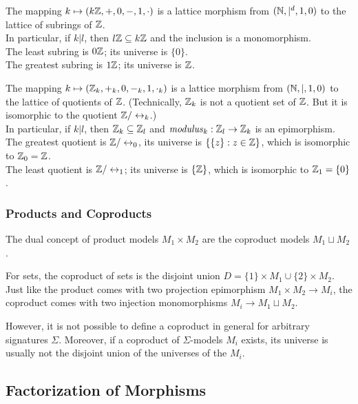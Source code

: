 \begin{example}\quad
\begin{compactitem}
\item The mapping $k\mapsto (k\mathbb{Z},+,0,-,1,\cdot)$ is a lattice morphism from $(\mathbb{N},|^d,1,0)$ to the lattice of subrings of $\mathbb{Z}$.\\
In particular, if $k|l$, then $l\mathbb{Z}\subseteq k\mathbb{Z}$ and the inclusion is a monomorphism.\\
The least subring is $0\mathbb{Z}$; its universe is $\{0\}$.\\
The greatest subring is $1\mathbb{Z}$; its universe is $\mathbb{Z}$.
\item The mapping $k\mapsto (\mathbb{Z}_k,+_k,0,-_k,1,\cdot_k)$ is a lattice morphism from $(\mathbb{N},|,1,0)$ to the lattice of quotients of $\mathbb{Z}$.
(Technically, $\mathbb{Z}_k$ is not a quotient set of $\mathbb{Z}$. But it is isomorphic to the quotient $\Z/\Equiv_k$.)\\
In particular, if $k|l$, then $\mathbb{Z}_k\subseteq \mathbb{Z}_l$ and $\mathit{modulus}_k:\mathbb{Z}_l\to\mathbb{Z}_k$ is an epimorphism.\\
The greatest quotient is $\Z/\Equiv_0$, its universe is $\{\{z\}:z\in \mathbb{Z}\}$, which is isomorphic to $\mathbb{Z}_0=\mathbb{Z}$.\\
The least quotient is $\Z/\Equiv_1$; its universe is $\{\mathbb{Z}\}$, which is isomorphic to $\mathbb{Z}_1=\{0\}$.
\end{compactitem}
\end{example}

\subsubsection{Products and Coproducts}\label{sec:univ:meta:prodcoprod}

The dual concept of product models $M_1\times M_2$ are the coproduct models $M_1\sqcup M_2$.

For sets, the coproduct of sets is the disjoint union $D=\{1\}\times M_1\cup \{2\}\times M_2$.
Just like the product comes with two projection epimorphism $M_1\times M_2\to M_i$, the coproduct comes with two injection monomorphisms $M_i\to M_1\sqcup M_2$.

However, it is not possible to define a coproduct in general for arbitrary signatures $\Sigma$.
Moreover, if a coproduct of $\Sigma$-models $M_i$ exists, its universe is usually not the disjoint union of the universes of the $M_i$.

\subsection{Factorization of Morphisms}

